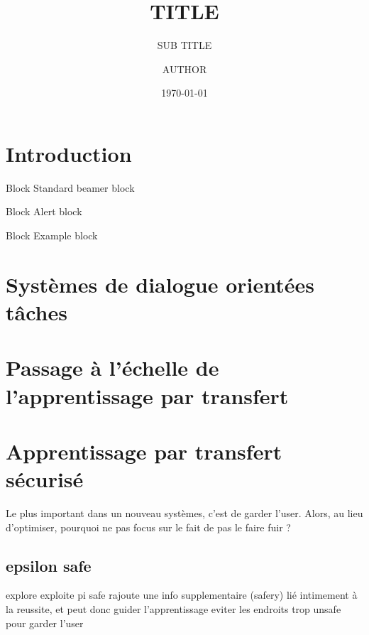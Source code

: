 \documentclass[french]{beamer}
\title[TITLE]{TITLE}
\subtitle{SUB TITLE}
\author{AUTHOR}
\institute[SCHOOL]{SCHOOL COLLEGE UNIVERSITY}
\date{\today}
\begin{document}
    \begin{frame}
        \maketitle
        \centering
    \end{frame}

    \section{Introduction}
    \begin{frame}
        \begin{block}{Block}
            Standard beamer block
        \end{block}
        \begin{alertblock}{Block}
            Alert block
        \end{alertblock}
        \begin{exampleblock}{Block}
            Example block
        \end{exampleblock}
    \end{frame}

    \begin{frame}
    \end{frame}
    \section{Systèmes de dialogue orientées tâches}
    \begin{frame}
    \end{frame}
    \section{Passage à l'échelle de l'apprentissage par transfert}
    \begin{frame}
    \end{frame}
    \section{Apprentissage par transfert sécurisé}

    \begin{frame}
        Le plus important dans un nouveau systèmes, c'est de garder l'user. Alors, au lieu d'optimiser, pourquoi ne pas focus sur le fait de pas le faire fuir ?
    \end{frame}

    \subsection{epsilon safe}
    \begin{frame}

        explore
        exploite
        pi safe
            rajoute une info supplementaire (safery) lié intimement à la reussite, et peut donc guider l'apprentissage
            eviter les endroits trop unsafe pour garder l'user
    \end{frame}
\end{document}
